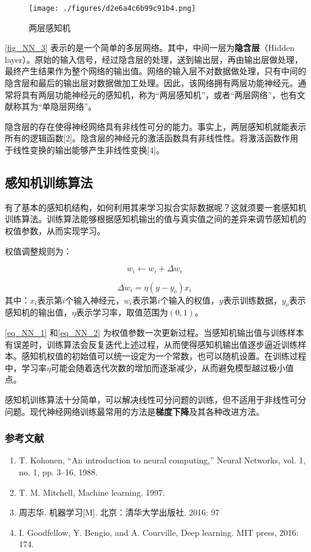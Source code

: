 \begin{figure}[ht]
\centering
\texttt{[image: ./figures/d2e6a4c6b99c91b4.png]}
\caption{两层感知机} \label{fig_NN_3}
\end{figure}
\autoref{fig_NN_3} 表示的是一个简单的多层网络。其中，中间一层为\textbf{隐含层}（Hidden layer）。原始的输入信号，经过隐含层的处理，送到输出层，再由输出层做处理，最终产生结果作为整个网络的输出值。网络的输入层不对数据做处理，只有中间的隐含层和最后的输出层对数据做加工处理。因此，该网络拥有两层功能神经元。通常将具有两层功能神经元的感知机，称为“两层感知机”，或者“两层网络”，也有文献称其为“单隐层网络”。

隐含层的存在使得神经网络具有非线性可分的能力。事实上，两层感知机就能表示所有的逻辑函数[2]。隐含层的神经元的激活函数具有非线性性。将激活函数作用于线性变换的输出能够产生非线性变换[4]。

\subsection{感知机训练算法}

有了基本的感知机结构，如何利用其来学习拟合实际数据呢？这就须要一套感知机训练算法。训练算法能够根据感知机输出的值与真实值之间的差异来调节感知机的权值参数，从而实现学习。

权值调整规则为：

\begin{equation}\label{eq_NN_1}
w_i \leftarrow w_i + \Delta w_i~
\end{equation}

\begin{equation}\label{eq_NN_2}
\Delta w_i = \eta(y-y_o)x_i~
\end{equation}
其中：$x_i$表示第$i$个输入神经元，$w_i$表示第$i$个输入的权值，$y$表示训练数据，$y_o$表示感知机的输出值，$\eta$表示学习率，取值范围为$(0,1)$。

\autoref{eq_NN_1} 和\autoref{eq_NN_2} 为权值参数一次更新过程。当感知机输出值与训练样本有误差时，训练算法会反复迭代上述过程，从而使得感知机输出值逐步逼近训练样本。感知机权值的初始值可以统一设定为一个常数，也可以随机设置。在训练过程中，学习率$\eta$可能会随着迭代次数的增加而逐渐减少，从而避免模型越过极小值点。

感知机训练算法十分简单，可以解决线性可分问题的训练，但不适用于非线性可分问题。现代神经网络训练最常用的方法是\textbf{梯度下降}及其各种改进方法。




\subsubsection{参考文献}
\begin{enumerate}
\item T. Kohonen, “An introduction to neural computing,” Neural Networks, vol. 1, no. 1, pp. 3–16, 1988.
\item T. M. Mitchell, Machine learning. 1997.
\item 周志华. 机器学习[M]. 北京：清华大学出版社. 2016: 97
\item I. Goodfellow, Y. Bengio, and A. Courville, Deep learning. MIT press, 2016: 174.
\end{enumerate}